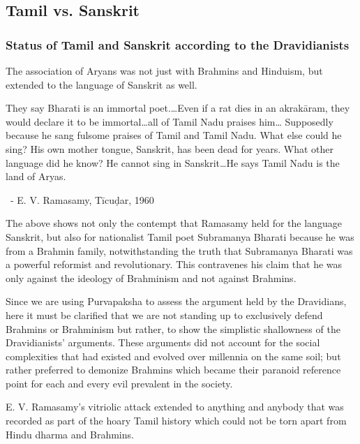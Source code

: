 \subsection*{Tamil vs. Sanskrit}

\subsubsection*{Status of Tamil and Sanskrit according to the Dravidianists}

The association of Aryans was not just with Brahmins and Hinduism, but extended to the language of Sanskrit as well.

\begin{myquote}
They say Bharati is an immortal poet.…Even if a rat dies in an akrakāram, they would declare it to be immortal…all of Tamil Nadu praises him… Supposedly because he sang fulsome praises of Tamil and Tamil Nadu. What else could he sing? His own mother tongue, Sanskrit, has been dead for years. What other language did he know? He cannot sing in Sanskrit…He says Tamil Nadu is the land of Aryas.

~\hfill - E. V. Ramasamy, Tīcuḍar, 1960
\end{myquote}

The above shows not only the contempt that Ramasamy held for the language Sanskrit, but also for nationalist Tamil poet Subramanya Bharati because he was from a Brahmin family, notwithstanding the truth that Subramanya Bharati was a powerful reformist and revolutionary. This contravenes his claim that he was only against the ideology of Brahminism and not against Brahmins.

Since we are using Purvapaksha to assess the argument held by the Dravidians, here it must be clarified that we are not standing up to exclusively defend Brahmins or Brahminism but rather, to show the simplistic shallowness of the Dravidianists’ arguments. These arguments did not account for the social complexities that had existed and evolved over millennia on the same soil; but rather preferred to demonize Brahmins which became their paranoid reference point for each and every evil prevalent in the society.

E. V. Ramasamy’s vitriolic attack extended to anything and anybody that was recorded as part of the hoary Tamil history which could not be torn apart from Hindu dharma and Brahmins.

